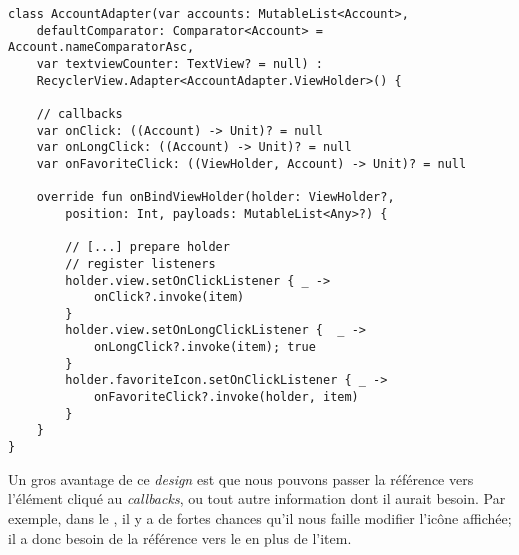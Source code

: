 \begin{verbatim}
class AccountAdapter(var accounts: MutableList<Account>,
    defaultComparator: Comparator<Account> = Account.nameComparatorAsc,
    var textviewCounter: TextView? = null) :
    RecyclerView.Adapter<AccountAdapter.ViewHolder>() {

    // callbacks 
    var onClick: ((Account) -> Unit)? = null
    var onLongClick: ((Account) -> Unit)? = null
    var onFavoriteClick: ((ViewHolder, Account) -> Unit)? = null

    override fun onBindViewHolder(holder: ViewHolder?, 
        position: Int, payloads: MutableList<Any>?) {

        // [...] prepare holder 
        // register listeners
        holder.view.setOnClickListener { _ -> 
            onClick?.invoke(item) 
        }
        holder.view.setOnLongClickListener {  _ -> 
            onLongClick?.invoke(item); true 
        }
        holder.favoriteIcon.setOnClickListener { _ -> 
            onFavoriteClick?.invoke(holder, item) 
        }
    }
}
\end{verbatim}
Un gros avantage de ce \emph{design} est que nous pouvons passer la référence vers l'élément cliqué au \emph{callbacks}, ou tout autre information dont il aurait besoin. Par exemple, dans le , il y a de fortes chances qu'il nous faille modifier l'icône affichée; il a donc besoin de la référence vers le  en plus de l'item.









